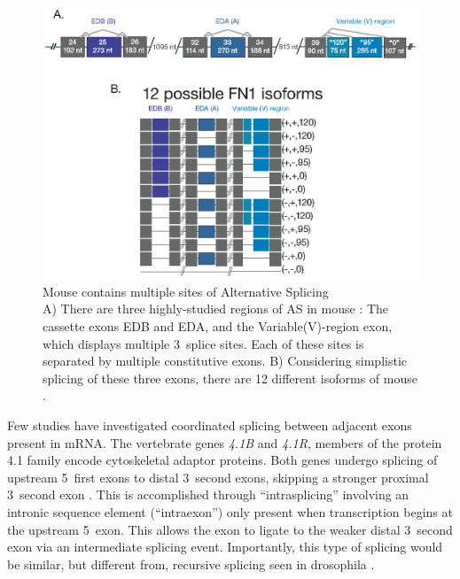     \begin{figure} %
      \centering 
      \includegraphics{Figures/Intro/Fibronectin.eps}
      \caption[Mouse \fn{} contains multiple sites of Alternative Splicing]
      {
        Mouse \fn{} contains multiple sites of Alternative Splicing\\[0.25cm]
        A) There are three highly-studied regions of AS in mouse \fn{}: The cassette exons EDB and EDA, and the Variable(V)-region exon, which displays multiple 3\textprime~splice sites.  Each of these sites is separated by multiple constitutive exons. B) Considering simplistic splicing of these three exons, there are 12 different isoforms of mouse \fn{}.
        }
      \label{Intro:fig:mouseFn1}
      \end{figure}

    Few studies have investigated coordinated splicing between adjacent exons present in mRNA. The vertebrate genes \textit{4.1B} and \textit{4.1R}, members of the protein 4.1 family encode cytoskeletal adaptor proteins. Both genes undergo splicing of upstream 5\textprime~first exons to distal 3\textprime~second exons, skipping a stronger proximal 3\textprime~second exon \citep{Parra2008, Parra2012}. This is accomplished through ``intrasplicing'' involving an intronic sequence element (``intraexon'') only present when transcription begins at the upstream 5\textprime~exon. This allows the exon to ligate to the weaker distal 3\textprime~second exon via an intermediate splicing event. Importantly, this type of splicing would be similar, but different from, recursive splicing seen in drosophila \citep{Burnette2005a}. 

